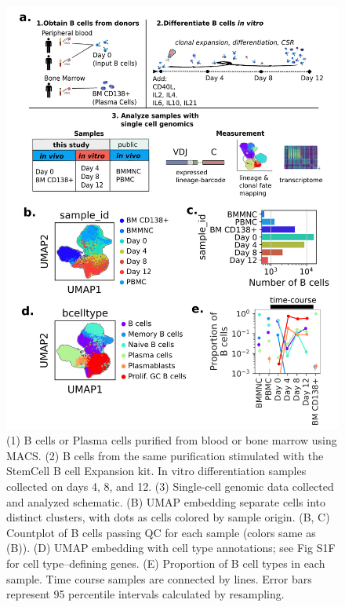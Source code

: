 \begin{figure}[hbt!]
\centering
\includegraphics[width=14cm, keepaspectratio]{figs/paper2/fig1_bcd.png}
\caption[Experimental overview for studying in vitro B cell dynamics using integrated single-cell genomics and lineage tracing.]{(1) B cells or Plasma cells purified from blood or bone marrow using MACS. (2) B cells from the same purification stimulated with the StemCell B cell Expansion kit. In vitro differentiation samples collected on days 4, 8, and 12. (3) Single-cell genomic data collected and analyzed schematic. (B) UMAP embedding separate cells into distinct clusters, with dots as cells colored by sample origin. (B, C) Countplot of B cells passing QC for each sample (colors same as (B)). (D) UMAP embedding with cell type annotations; see Fig S1F for cell type–defining genes. (E) Proportion of B cell types in each sample. Time course samples are connected by lines. Error bars represent 95 percentile intervals calculated by resampling.}
\label{fig:paper2_fig_1}
\end{figure}

